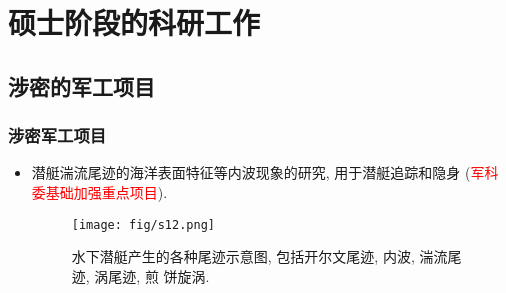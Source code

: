 \documentclass[UTF8]{ctexbeamer}	%
\theoremstyle{plain}
\theoremstyle{definition}
\theoremstyle{remark}
\numberwithin{equation}{section}
\begin{document}

\section{硕士阶段的科研工作}
\subsection{涉密的军工项目}
\begin{frame}
    \frametitle{涉密军工项目}
    \begin{itemize}
        \item 潜艇湍流尾迹的海洋表面特征等内波现象的研究, 用于潜艇追踪和隐身
              (\textcolor{red}{军科委基础加强重点项目}).
              \begin{figure}
                  \texttt{[image: fig/s12.png]}
                  \caption{水下潜艇产生的各种尾迹示意图, 包括开尔文尾迹, 内波, 湍流尾迹, 涡尾迹, 煎
                      饼旋涡.}
              \end{figure}
    \end{itemize}
\end{frame}
\end{document}
